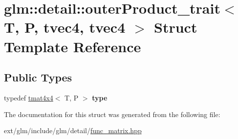 \hypertarget{structglm_1_1detail_1_1outer_product__trait_3_01_t_00_01_p_00_01tvec4_00_01tvec4_01_4}{\section{glm\-:\-:detail\-:\-:outer\-Product\-\_\-trait$<$ T, P, tvec4, tvec4 $>$ Struct Template Reference}
\label{structglm_1_1detail_1_1outer_product__trait_3_01_t_00_01_p_00_01tvec4_00_01tvec4_01_4}
}
\subsection*{Public Types}
\begin{DoxyCompactItemize}
\item 
\hypertarget{structglm_1_1detail_1_1outer_product__trait_3_01_t_00_01_p_00_01tvec4_00_01tvec4_01_4_a89f0d2b33be6604293d1373176291811}{typedef \hyperlink{structglm_1_1tmat4x4}{tmat4x4}$<$ T, P $>$ {\bfseries type}}\label{structglm_1_1detail_1_1outer_product__trait_3_01_t_00_01_p_00_01tvec4_00_01tvec4_01_4_a89f0d2b33be6604293d1373176291811}

\end{DoxyCompactItemize}


The documentation for this struct was generated from the following file\-:\begin{DoxyCompactItemize}
\item 
ext/glm/include/glm/detail/\hyperlink{func__matrix_8hpp}{func\-\_\-matrix.\-hpp}\end{DoxyCompactItemize}
